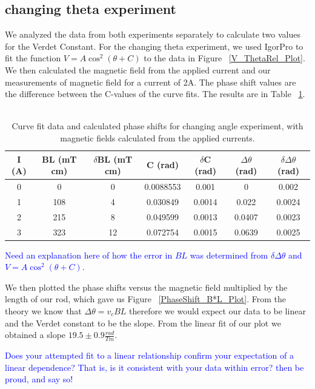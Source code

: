 \documentclass[prb,preprint]{revtex4-1}
\begin{document}
\subsection{changing theta experiment}
We analyzed the data from both experiments separately to calculate two values for the Verdet Constant.  For the changing theta experiment, we used IgorPro to fit the function $V = A \cos ^2 (\theta + C)$ to the data in Figure ~\ref{V_ThetaRel_Plot}.  We then calculated the magnetic field from the applied current and our measurements of magnetic field for a current of 2A. The phase shift values are the difference between the C-values of the curve fits.  The results are in Table ~\ref{B*L_PhaseShift_Table}.  
\
\begin{table}[h!]
\centering
\caption{Curve fit data and calculated phase shifts for changing angle experiment, with magnetic fields calculated from the applied currents.}
\begin{ruledtabular}
\begin{tabular}{c c c c c c c}
I (A) & BL (mT cm) & $\delta$BL (mT cm) & C (rad)& $\delta$C (rad) & $\Delta \theta$ (rad) & $\delta \Delta \theta$ (rad)\\
\hline	%
0 &  0  & 0 &  0.0088553 & 0.001 & 0 & 0.002    \\
1 & 108 & 4  & 0.030849  & 0.0014 & 0.022  & 0.0024 \\
2 & 215 & 8 & 0.049599  & 0.0013 & 0.0407 & 0.0023  \\
3 & 323 & 12 & 0.072754  & 0.0015 & 0.0639 & 0.0025 
\end{tabular}
\end{ruledtabular}
\label{B*L_PhaseShift_Table}
\end{table}

\textcolor{blue}{Need an explanation here of how the error in $BL$ was determined from $\delta \Delta \theta$  and  $V = A \cos ^2 (\theta + C)$. }


We then plotted the phase shifts versus the magnetic field multiplied by the length of our rod, which gave us Figure ~\ref{PhaseShift_B*L_Plot}. From the theory we know that $\Delta \theta = v_c B L$ therefore we would expect our data to be linear and the Verdet constant to be the slope. From the linear fit of our plot we obtained a slope $19.5 \pm0.9 \frac{rad}{Tm}$.

\textcolor{blue}{Does your attempted fit to a linear relationship confirm your expectation of a linear dependence? That is, is it consistent with your data within error? then be proud, and say so! } 
\end{document}
